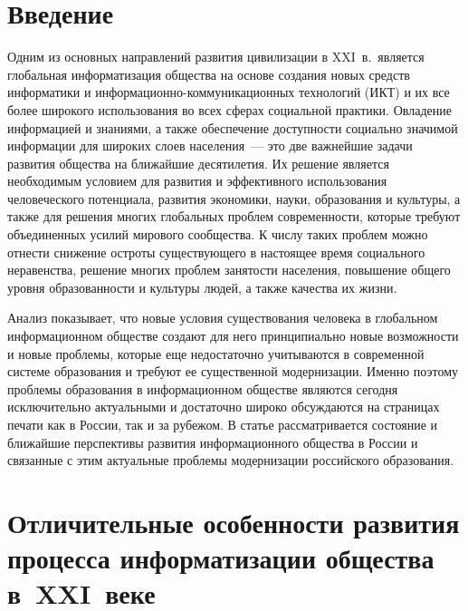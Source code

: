       \begin{multicols}{2}

      \label{st\stat}

\section{Введение}

   Одним из основных направлений развития цивилизации в XXI~в.\ является
глобальная информатизация общества на основе создания новых средств информатики и
информационно-ком\-му\-ни\-ка\-ци\-он\-ных технологий (ИКТ) и их все более широкого
использования во всех сферах социальной практики. Овладение информацией и знаниями,
а также обеспечение доступности социально значимой информации для широких слоев
населения~--- это две важнейшие задачи развития общества на ближайшие десятилетия.
Их решение является необходимым условием для развития и эффективного использования
человеческого потенциала, развития экономики, науки, образования и культуры, а также
для решения многих глобальных проблем современности, которые требуют объединенных
усилий мирового сообщества. К чис\-лу таких проблем можно отнести снижение остроты
существующего в настоящее время социального неравенства, решение многих проблем
занятости населения, повышение общего уровня образованности и культуры людей, а
также качества их жизни.

   Анализ показывает, что новые условия существования человека в глобальном
информационном обществе создают для него принципиально новые возможности и новые
проблемы, которые еще недостаточно учитываются в современной системе образования и
требуют ее существенной модернизации. Именно поэтому проблемы образования в
информационном обществе являются сегодня исключительно актуальными и достаточно
широко обсуждаются на страницах печати как в России, так и за рубежом. В статье
рас\-смат\-ри\-ва\-ет\-ся состояние и ближайшие перспективы развития информационного
общества в России и связанные с этим актуальные проблемы модернизации российского
образования.

\section{Отличительные особенности развития процесса
информатизации общества в~XXI~веке}


\end{multicols}
